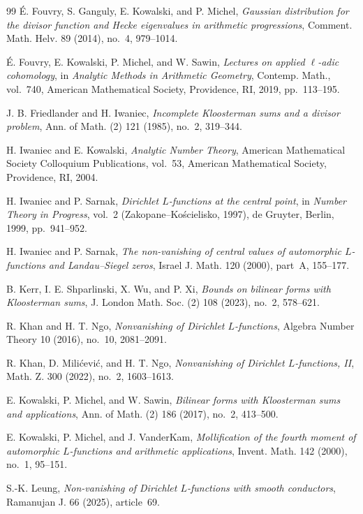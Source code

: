 \documentclass[12pt, a4paper]{amsart}
\numberwithin{equation}{section}
\theoremstyle{plain}
\begin{document}
\begin{thebibliography}{99}
\'E. Fouvry, S. Ganguly, E. Kowalski, and P. Michel,
\emph{Gaussian distribution for the divisor function and Hecke eigenvalues
in arithmetic progressions},
Comment. Math. Helv. 89 (2014), no.~4, 979--1014.

\'E. Fouvry, E. Kowalski, P. Michel, and W. Sawin, \emph{Lectures on applied $\ell$-adic cohomology}, in \emph{Analytic Methods in Arithmetic Geometry}, Contemp. Math., vol.~740, American Mathematical Society, Providence, RI, 2019, pp.~113--195.

J. B. Friedlander and H. Iwaniec, \emph{Incomplete Kloosterman sums and a divisor problem}, Ann. of Math. (2) 121 (1985), no.~2, 319--344.

H. Iwaniec and E. Kowalski,
\emph{Analytic Number Theory},
American Mathematical Society Colloquium Publications, vol.~53,
American Mathematical Society, Providence, RI, 2004.

H. Iwaniec and P. Sarnak,
\emph{Dirichlet $L$-functions at the central point},
in \emph{Number Theory in Progress}, vol.~2
(Zakopane--Ko\'scielisko, 1997),
de Gruyter, Berlin, 1999, pp.~941--952.

H. Iwaniec and P. Sarnak, \emph{The non-vanishing of central values of automorphic $L$-functions and Landau--Siegel zeros}, Israel J. Math. 120 (2000), part~A, 155--177.

B. Kerr, I. E. Shparlinski, X. Wu, and P. Xi, \emph{Bounds on bilinear forms with Kloosterman sums}, J. London Math. Soc. (2) 108 (2023), no.~2, 578--621.

R. Khan and H. T. Ngo,
\emph{Nonvanishing of Dirichlet $L$-functions},
Algebra Number Theory 10 (2016), no.~10, 2081--2091.

R. Khan, D. Mili\'cevi\'c, and H. T. Ngo,
\emph{Nonvanishing of Dirichlet $L$-functions, II},
Math. Z. 300 (2022), no.~2, 1603--1613.

E. Kowalski, P. Michel, and W. Sawin, \emph{Bilinear forms with Kloosterman sums and applications}, Ann. of Math. (2) 186 (2017), no.~2, 413--500.

E. Kowalski, P. Michel, and J. VanderKam, \emph{Mollification of the fourth moment of automorphic $L$-functions and arithmetic applications}, Invent. Math. 142 (2000), no.~1, 95--151.

S.-K. Leung,
\emph{Non-vanishing of Dirichlet $L$-functions with smooth conductors},
Ramanujan J. 66 (2025), article~69.


\end{thebibliography}
\end{document}
